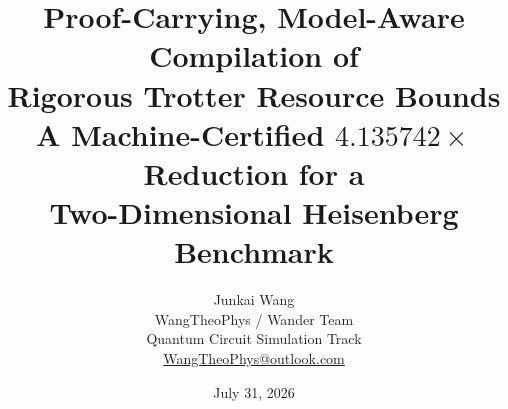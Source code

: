 \documentclass[11pt]{article}
\title{\textbf{Proof-Carrying, Model-Aware Compilation of\\
Rigorous Trotter Resource Bounds}\\[0.4em]
\large A Machine-Certified $4.135742\times$ Reduction for a\\
Two-Dimensional Heisenberg Benchmark}
\author{Junkai Wang\\
\small WangTheoPhys / Wander Team\\
\small Quantum Circuit Simulation Track\\
\small \href{mailto:WangTheoPhys@outlook.com}{WangTheoPhys@outlook.com}}
\date{July 31, 2026}
\theoremstyle{definition}
\begin{document}
\maketitle

\tableofcontents
\clearpage
















\appendix


{\small


}
\end{document}
